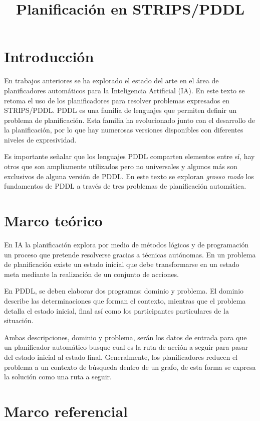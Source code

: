 \documentclass[a4paper,12pt,twocolumn]{article}
\title{Planificación en STRIPS/PDDL}
\makeatletter
\let\newtitle\@title
\makeatother
\begin{document}
\textcolor{UnirDark}{\LARGE\bfseries\newtitle}

\section{Introducción}

En trabajos anteriores se ha explorado el estado del arte en el área de planificadores automáticos para la Inteligencia Artificial (IA). En este texto se retoma el uso de los planificadores para resolver problemas expresados en STRIPS/PDDL. PDDL es una familia de lenguajes que permiten definir un problema de planificación. Esta familia ha evolucionado junto con el desarrollo de la planificación, por lo que hay numerosas versiones disponibles con diferentes niveles de expresividad.~\citep{Green_2021a}

Es importante señalar que los lenguajes PDDL comparten elementos entre sí, hay otros que son ampliamente utilizados pero no universales y algunos más son exclusivos de alguna versión de PDDL. En este texto se exploran \textit{grosso modo} los fundamentos de PDDL a través de tres problemas de planificación automática.

\section{Marco teórico}

En IA la planificación explora por medio de métodos lógicos y de programación un proceso que pretende resolverse gracias a técnicas autónomas. En un problema de planificación existe un estado inicial que debe transformarse en un estado meta mediante la realización de un conjunto de acciones.~\citep{Ghallab_Nau_Traverso_2004, Green_2021b}

En PDDL, se deben elaborar dos programas: dominio y problema. El dominio describe las determinaciones que forman el contexto, mientras que el problema detalla el estado inicial, final así como los participantes particulares de la situación.

Ambas descripciones, dominio y problema, serán los datos de entrada para que un planificador automático busque cual es la ruta de acción a seguir para pasar del estado inicial al estado final. Generalmente, los planificadores reducen el problema a un contexto de búsqueda dentro de un grafo, de esta forma se expresa la solución como una ruta a seguir.

\section{Marco referencial}
\end{document}
